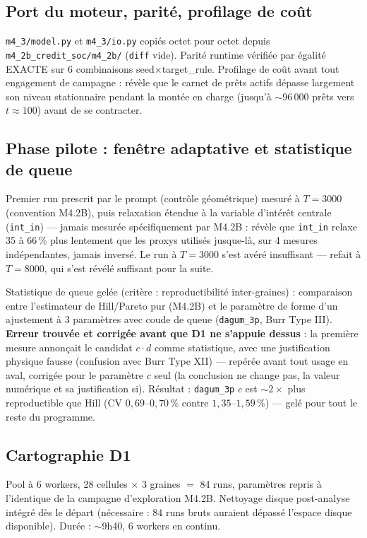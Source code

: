\documentclass[11pt,a4paper]{article}
\newcommand{\code}[1]{\texttt{#1}}
\begin{document}
\subsection{Port du moteur, parité, profilage de coût}

\code{m4\_3/model.py} et \code{m4\_3/io.py} copiés octet pour octet
depuis \code{m4\_2b\_credit\_soc/m4\_2b/} (\code{diff} vide). Parité
runtime vérifiée par égalité EXACTE sur 6 combinaisons
seed$\times$target\_rule. Profilage de coût avant tout engagement de
campagne : révèle que le carnet de prêts actifs dépasse largement son
niveau stationnaire pendant la montée en charge (jusqu'à $\sim$96\,000
prêts vers $t\approx100$) avant de se contracter.

\subsection{Phase pilote : fenêtre adaptative et statistique de queue}

Premier run prescrit par le prompt (contrôle géométrique) mesuré à
$T=3000$ (convention M4.2B), puis relaxation étendue à la variable
d'intérêt centrale (\code{int\_in}) --- jamais mesurée spécifiquement par
M4.2B : révèle que \code{int\_in} relaxe 35 à 66\,\% plus lentement que
les proxys utilisés jusque-là, sur 4 mesures indépendantes, jamais
inversé. Le run à $T=3000$ s'est avéré insuffisant --- refait à
$T=8000$, qui s'est révélé suffisant pour la suite.

Statistique de queue gelée (critère : reproductibilité inter-graines) :
comparaison entre l'estimateur de Hill/Pareto pur (M4.2B) et le paramètre
de forme d'un ajustement à 3 paramètres avec coude de queue
(\code{dagum\_3p}, Burr Type III). \textbf{Erreur trouvée et corrigée
avant que D1 ne s'appuie dessus} : la première mesure annonçait le
candidat $c\cdot d$ comme statistique, avec une justification physique
fausse (confusion avec Burr Type XII) --- repérée avant tout usage en
aval, corrigée pour le paramètre $c$ seul (la conclusion ne change pas,
la valeur numérique et sa justification si). Résultat : \code{dagum\_3p}
$c$ est $\sim2\times$ plus reproductible que Hill (CV
$0{,}69$--$0{,}70\,\%$ contre $1{,}35$--$1{,}59\,\%$) --- gelé pour tout
le reste du programme.

\subsection{Cartographie D1}

Pool à 6 workers, 28 cellules $\times$ 3 graines $=$ 84 runs, paramètres
repris à l'identique de la campagne d'exploration M4.2B. Nettoyage disque
post-analyse intégré dès le départ (nécessaire : 84 runs bruts auraient
dépassé l'espace disque disponible). Durée : $\sim$9h40, 6 workers en
continu.
\end{document}
